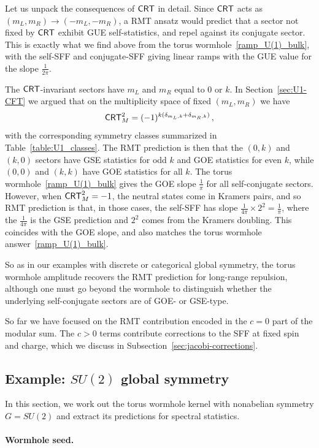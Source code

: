 \documentclass[11pt]{article}
\numberwithin{equation}{section}
\begin{document}
Let us unpack the consequences of $\mathsf{CRT}$ in detail. Since $\mathsf{CRT}$ acts as $(m_L,m_R)\to (-m_L,-m_R)$, a RMT ansatz would predict that a sector not fixed by $\mathsf{CRT}$ exhibit GUE self-statistics, and repel against its conjugate sector. This is exactly what we find above from the torus wormhole~\eqref{ramp_U(1)_bulk}, with the self-SFF and conjugate-SFF giving linear ramps with the GUE value for the slope $\frac{1}{2\pi}$. 

The $\mathsf{CRT}$-invariant sectors have $m_L$ and $m_R$ equal to $0$ or $k$. In Section~\ref{sec:U1-CFT} we argued that on the multiplicity space of fixed $(m_L,m_R)$ we have
\begin{equation}
    \mathsf{CRT}^2_{M} = (-1)^{k(\delta_{m_L,k}+\delta_{m_R,k})}\,,
\end{equation}
with the corresponding symmetry classes summarized in Table~\ref{table:U1_classes}.
The RMT prediction is then that the $(0,k)$ and $(k,0)$ sectors have GSE statistics for odd $k$ and GOE statistics for even $k$, while $(0,0)$ and $(k,k)$ have GOE statistics for all $k$. The torus wormhole~\eqref{ramp_U(1)_bulk} gives the GOE slope $\frac{1}{\pi}$ for all self-conjugate sectors. However, when $\mathsf{CRT}^2_M=-1$, the neutral states come in Kramers pairs, and so RMT prediction is that, in those cases, the self-SFF has slope $\frac{1}{4\pi} \times 2^2 = \frac{1}{\pi}$, where the $\frac{1}{4\pi}$ is the GSE prediction and $2^2$ comes from the Kramers doubling. This coincides with the GOE slope, and also matches the torus wormhole answer~\eqref{ramp_U(1)_bulk}. 

So as in our examples with discrete or categorical global symmetry, the torus wormhole amplitude recovers the RMT prediction for long-range repulsion, although one must go beyond the wormhole to distinguish whether the underlying self-conjugate sectors are of GOE- or GSE-type.

So far we have focused on the RMT contribution encoded in the $c=0$ part of the modular sum. The $c>0$ terms contribute corrections to the SFF at fixed spin and charge, which we discuss in Subsection~\ref{sec:jacobi-corrections}. 

\subsection{Example: $SU(2)$ global symmetry}
\label{sec:nonabelian-holography}
In this section, we work out the  torus wormhole kernel with nonabelian symmetry  $G=SU(2)$ and extract its predictions for spectral statistics.
\paragraph{Wormhole seed.}
\end{document}

